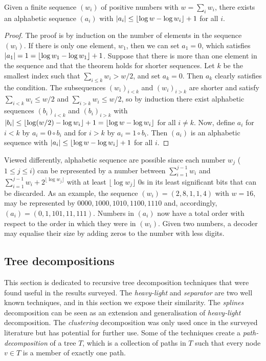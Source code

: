 \begin{lemma}\label{lemma:Gilbert}
Given a finite sequence $(w_i)$ of positive numbers with $w=\sum_iw_i$, there exists an alphabetic sequence $(a_i)$ with $|a_i|\leq \left\lfloor{\log w - \log w_i}\right\rfloor+1$ for all $i$.
\end{lemma}	
\begin{proof}
The proof is by induction on the number of elements in the sequence $(w_i)$. If there is only one element, $w_1$, then we can set $a_1=0$, which satisfies $|a_1|=1 =\left\lfloor{\log w_1-\log w_1}\right\rfloor+1$.  Suppose that there is more than one element in the sequence and that the theorem holds for shorter sequences. Let $k$ be the smallest index such that $\sum_{i\leq k} w_i>w/2$, and set $a_k=0$.  Then $a_k$ clearly satisfies the condition. The subsequences $(w_i)_{i<k}$ and $(w_i)_{i>k}$ are shorter and satisfy $\sum_{i<k}w_i\leq w/2$ and $\sum_{i>k}w_i\leq w/2$, so by induction there exist alphabetic sequences $(b_i)_{i<k}$ and $(b_i)_{i>k}$ with $|b_i|\leq \left\lfloor{\log(w/2)-\log w_i}\right\rfloor +1 = \left\lfloor{\log w-\log w_i}\right\rfloor $ for all $i\neq k$. Now, define $a_i$ for $i<k$ by $a_i=0\circ b_i$ and for $i>k$ by $a_i=1\circ b_i$. Then $(a_i)$ is an alphabetic sequence with $|a_i|\leq\left\lfloor{\log w-\log w_i}\right\rfloor+1$ for all $i$.
\end{proof}

Viewed differently,  alphabetic sequence are possible since each number $w_j$  ($1 \leq j \leq i$) can be represented by a number between  $\sum_{i=1}^{j-1}w_i$ and  $ \sum_{i=1}^{j-1}w_i +2^{\lfloor \log w_j \rfloor}$  with at least $\lfloor \log w_j \rfloor$ $0$s in its least significant bits that can be discarded.
As an example, the sequence $(w_i)=(2,8,1,1,4)$ with $w=16$,    may be represented by $0000,1000,1010,1100,1110$ and, accordingly, $(a_i) = (0,1,101,11,111)$.
Numbers in $(a_i)$ now have a total order with respect to the order in which they were in $(w_i)$. Given two numbers, a decoder may equalise their size by adding zeros to the number with less digits. 



\subsection{Tree decompositions}\label{section:Tree-decompositions}
This section is dedicated to recursive tree decomposition techniques that were found useful in  the results surveyed.
The \emph{heavy-light} and \emph{separator} are two well known techniques, and in this section we expose their similarity.
The \emph{splines} decomposition can be seen as an extension and generalisation of \emph{heavy-light} decomposition.
The \emph{clustering} decomposition was only used once in the surveyed literature but has potential for further use. 
Some of the techniques create a  \emph{path-decomposition} of a tree $T$, which is a collection of paths in $T$ such that every node $v \in T$ is a member of exactly one path.


